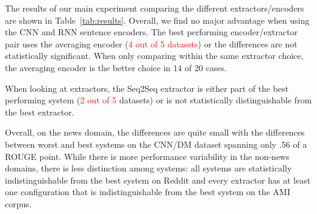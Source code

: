 

The results of our main experiment comparing 
the different extractors/encoders are shown in 
Table~\ref{tab:results}.
Overall, we find no major advantage when using the CNN and RNN sentence
encoders. The best performing encoder/extractor pair uses the averaging 
encoder (\textcolor{red}{4 out of 5 datasets}) or the differences 
are not statistically significant. When only comparing within the 
same extractor choice,  the averaging encoder is the better choice
in 14 of 20 cases. 



When looking at extractors, the Seq2Seq extractor is either part of 
the best performing system (\textcolor{red}{2 out of 5} datasets) or is not 
statistically distinguishable from the best extractor. 

Overall, on the news domain, the differences are quite small with the 
differences between worst and best systems on the CNN/DM dataset 
spanning only .56 of a ROUGE point. While there is more performance variability
 in the non-news domains, there is less distinction among systems: all systems
are statistically indistinguishable from the best system on Reddit
and every extractor has at least one configuration that is indistinguishable
from the best system on the AMI corpus.





